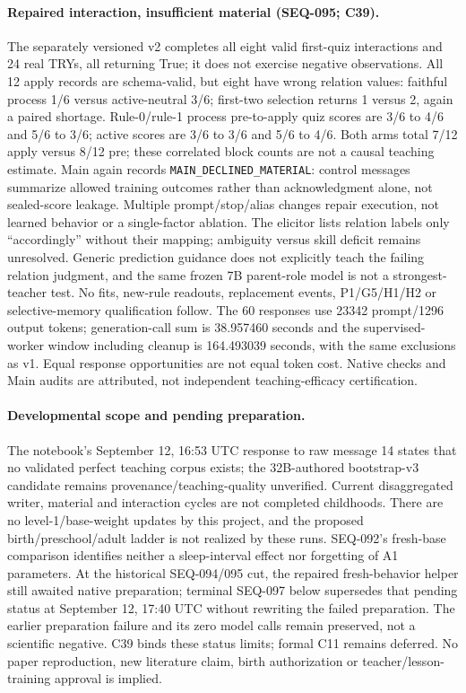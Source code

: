 \documentclass{article}
\begin{document}
\paragraph{Repaired interaction, insufficient material (SEQ-095; C39).} The separately versioned v2 completes all eight valid first-quiz interactions and 24 real TRYs, all returning True; it does not exercise negative observations. All 12 apply records are schema-valid, but eight have wrong relation values: faithful process 1/6 versus active-neutral 3/6; first-two selection returns 1 versus 2, again a paired shortage. Rule-0/rule-1 process pre-to-apply quiz scores are 3/6 to 4/6 and 5/6 to 3/6; active scores are 3/6 to 3/6 and 5/6 to 4/6. Both arms total 7/12 apply versus 8/12 pre; these correlated block counts are not a causal teaching estimate. Main again records \texttt{MAIN\_DECLINED\_MATERIAL}: control messages summarize allowed training outcomes rather than acknowledgment alone, not sealed-score leakage. Multiple prompt/stop/alias changes repair execution, not learned behavior or a single-factor ablation. The elicitor lists relation labels only ``accordingly'' without their mapping; ambiguity versus skill deficit remains unresolved. Generic prediction guidance does not explicitly teach the failing relation judgment, and the same frozen 7B parent-role model is not a strongest-teacher test. No fits, new-rule readouts, replacement events, P1/G5/H1/H2 or selective-memory qualification follow. The 60 responses use 23342 prompt/1296 output tokens; generation-call sum is 38.957460 seconds and the supervised-worker window including cleanup is 164.493039 seconds, with the same exclusions as v1. Equal response opportunities are not equal token cost. Native checks and Main audits are attributed, not independent teaching-efficacy certification.

\paragraph{Developmental scope and pending preparation.} The notebook's September 12, 16:53 UTC response to raw message 14 states that no validated perfect teaching corpus exists; the 32B-authored bootstrap-v3 candidate remains provenance/teaching-quality unverified. Current disaggregated writer, material and interaction cycles are not completed childhoods. There are no level-1/base-weight updates by this project, and the proposed birth/preschool/adult ladder is not realized by these runs. SEQ-092's fresh-base comparison identifies neither a sleep-interval effect nor forgetting of A1 parameters. At the historical SEQ-094/095 cut, the repaired fresh-behavior helper still awaited native preparation; terminal SEQ-097 below supersedes that pending status at September 12, 17:40 UTC without rewriting the failed preparation. The earlier preparation failure and its zero model calls remain preserved, not a scientific negative. C39 binds these status limits; formal C11 remains deferred. No paper reproduction, new literature claim, birth authorization or teacher/lesson-training approval is implied.
\end{document}
